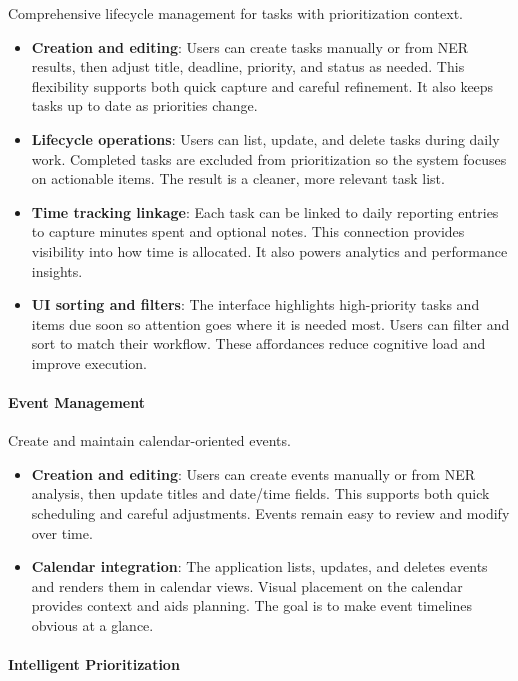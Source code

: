 \documentclass[12pt,a4paper]{article}
\begin{document}
Comprehensive lifecycle management for tasks with prioritization context.
\begin{itemize}
  \item \textbf{Creation and editing}: Users can create tasks manually or from NER results, then adjust title, deadline, priority, and status as needed. This flexibility supports both quick capture and careful refinement. It also keeps tasks up to date as priorities change.
  \item \textbf{Lifecycle operations}: Users can list, update, and delete tasks during daily work. Completed tasks are excluded from prioritization so the system focuses on actionable items. The result is a cleaner, more relevant task list.
  \item \textbf{Time tracking linkage}: Each task can be linked to daily reporting entries to capture minutes spent and optional notes. This connection provides visibility into how time is allocated. It also powers analytics and performance insights.
  \item \textbf{UI sorting and filters}: The interface highlights high-priority tasks and items due soon so attention goes where it is needed most. Users can filter and sort to match their workflow. These affordances reduce cognitive load and improve execution.
\end{itemize}

\paragraph{Event Management}\mbox{}

Create and maintain calendar-oriented events.
\begin{itemize}
  \item \textbf{Creation and editing}: Users can create events manually or from NER analysis, then update titles and date/time fields. This supports both quick scheduling and careful adjustments. Events remain easy to review and modify over time.
  \item \textbf{Calendar integration}: The application lists, updates, and deletes events and renders them in calendar views. Visual placement on the calendar provides context and aids planning. The goal is to make event timelines obvious at a glance.
\end{itemize}

\paragraph{Intelligent Prioritization}\mbox{}
\end{document}
